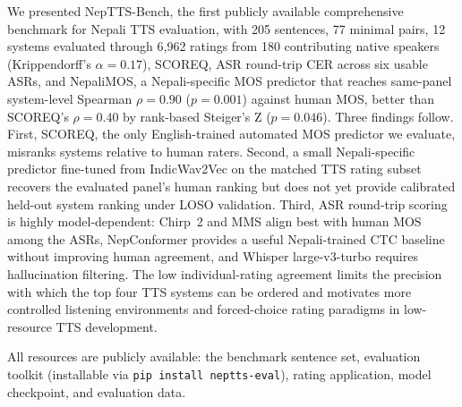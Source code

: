 \documentclass[11pt]{article}
\begin{document}
We presented NepTTS-Bench, the first publicly available comprehensive benchmark for Nepali TTS evaluation, with 205 sentences, 77 minimal pairs, 12 systems evaluated through 6{,}962 ratings from 180 contributing native speakers (Krippendorff's $\alpha = 0.17$), SCOREQ, ASR round-trip CER across six usable ASRs, and NepaliMOS, a Nepali-specific MOS predictor that reaches same-panel system-level Spearman $\rho = 0.90$ ($p = 0.001$) against human MOS, better than SCOREQ's $\rho = 0.40$ by rank-based Steiger's Z ($p = 0.046$). Three findings follow. First, SCOREQ, the only English-trained automated MOS predictor we evaluate, misranks systems relative to human raters. Second, a small Nepali-specific predictor fine-tuned from IndicWav2Vec on the matched TTS rating subset recovers the evaluated panel's human ranking but does not yet provide calibrated held-out system ranking under LOSO validation. Third, ASR round-trip scoring is highly model-dependent: Chirp~2 and MMS align best with human MOS among the ASRs, NepConformer provides a useful Nepali-trained CTC baseline without improving human agreement, and Whisper large-v3-turbo requires hallucination filtering. The low individual-rating agreement limits the precision with which the top four TTS systems can be ordered and motivates more controlled listening environments and forced-choice rating paradigms in low-resource TTS development.

All resources are publicly available: the benchmark sentence set, evaluation toolkit (installable via \texttt{pip install neptts-eval}), rating application, model checkpoint, and evaluation data.



\end{document}
